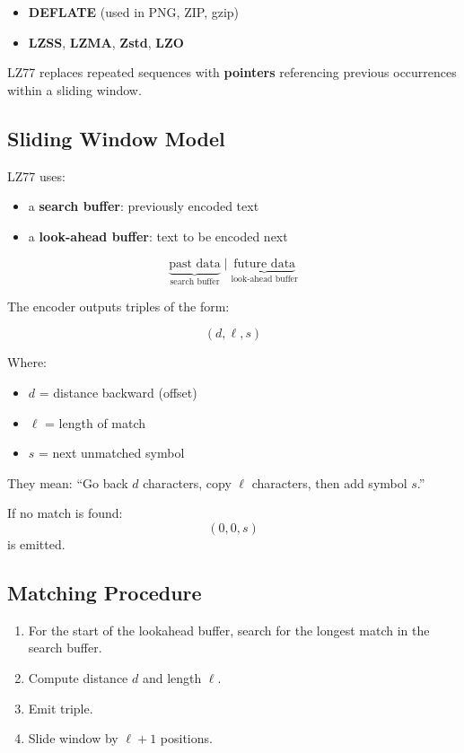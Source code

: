 \documentclass{AnantDocumentation}
\begin{document}
\begin{itemize}
\item \textbf{DEFLATE} (used in PNG, ZIP, gzip)
\item \textbf{LZSS}, \textbf{LZMA}, \textbf{Zstd}, \textbf{LZO}
\end{itemize}

LZ77 replaces repeated sequences with \textbf{pointers} referencing previous occurrences within a sliding window.

\subsection{Sliding Window Model}

LZ77 uses:
\begin{itemize}
\item a \textbf{search buffer}: previously encoded text
\item a \textbf{look-ahead buffer}: text to be encoded next
\end{itemize}

\[
\underbrace{\text{past data}}_{\text{search buffer}}
\;|\;
\underbrace{\text{future data}}_{\text{look-ahead buffer}}
\]

The encoder outputs triples of the form:

\[
(d, \ell, s)
\]

Where:
\begin{itemize}
\item \(d\) = distance backward (offset)
\item \(\ell\) = length of match
\item \(s\) = next unmatched symbol
\end{itemize}

They mean:  
“Go back \(d\) characters, copy \(\ell\) characters, then add symbol \(s\).”

If no match is found:
\[
(0, 0, s)
\]
is emitted.

\subsection{Matching Procedure}

\begin{enumerate}
\item For the start of the lookahead buffer, search for the longest match in the search buffer.
\item Compute distance \(d\) and length \(\ell\).
\item Emit triple.
\item Slide window by \(\ell + 1\) positions.
\end{enumerate}
\end{document}

